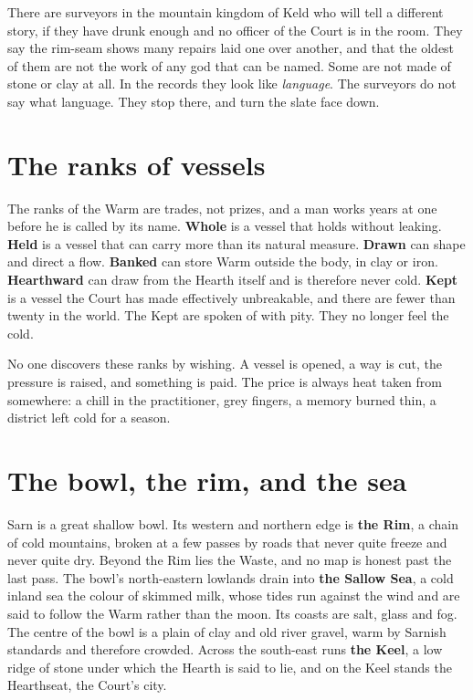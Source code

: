 \documentclass{design/chronicle}
\begin{document}
There are surveyors in the mountain kingdom of Keld who will tell a different story, if they have drunk enough and no officer of the Court is in the room. They say the rim-seam shows many repairs laid one over another, and that the oldest of them are not the work of any god that can be named. Some are not made of stone or clay at all. In the records they look like \emph{language}. The surveyors do not say what language. They stop there, and turn the slate face down.

\section*{The ranks of vessels}

The ranks of the Warm are trades, not prizes, and a man works years at one before he is called by its name. \textbf{Whole} is a vessel that holds without leaking. \textbf{Held} is a vessel that can carry more than its natural measure. \textbf{Drawn} can shape and direct a flow. \textbf{Banked} can store Warm outside the body, in clay or iron. \textbf{Hearthward} can draw from the Hearth itself and is therefore never cold. \textbf{Kept} is a vessel the Court has made effectively unbreakable, and there are fewer than twenty in the world. The Kept are spoken of with pity. They no longer feel the cold.

No one discovers these ranks by wishing. A vessel is opened, a way is cut, the pressure is raised, and something is paid. The price is always heat taken from somewhere: a chill in the practitioner, grey fingers, a memory burned thin, a district left cold for a season.

\section*{The bowl, the rim, and the sea}

Sarn is a great shallow bowl. Its western and northern edge is \textbf{the Rim}, a chain of cold mountains, broken at a few passes by roads that never quite freeze and never quite dry. Beyond the Rim lies the Waste, and no map is honest past the last pass. The bowl’s north-eastern lowlands drain into \textbf{the Sallow Sea}, a cold inland sea the colour of skimmed milk, whose tides run against the wind and are said to follow the Warm rather than the moon. Its coasts are salt, glass and fog. The centre of the bowl is a plain of clay and old river gravel, warm by Sarnish standards and therefore crowded. Across the south-east runs \textbf{the Keel}, a low ridge of stone under which the Hearth is said to lie, and on the Keel stands the Hearthseat, the Court’s city.
\end{document}
